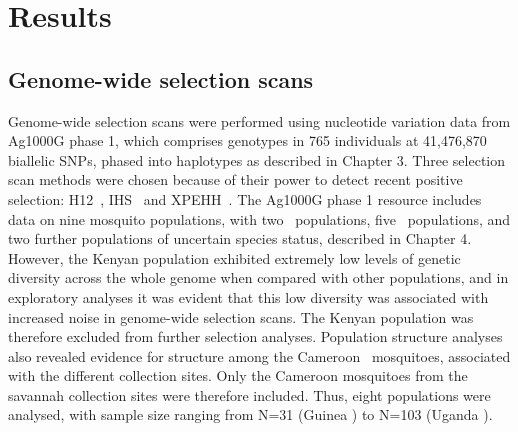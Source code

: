 \documentclass[a4paper,11pt,abstracton,hidelinks]{scrartcl}
\begin{document}
\section{Results}\label{sec:results}


\subsection{Genome-wide selection scans}\label{subsec:results-gwss}


Genome-wide selection scans were performed using nucleotide variation data from Ag1000G phase 1, which comprises genotypes in 765 individuals at 41,476,870 biallelic SNPs, phased into haplotypes as described in Chapter 3.
%
Three selection scan methods were chosen because of their power to detect recent positive selection: H12~\parencite{Garud2015}, IHS~\parencite{Voight2006} and XPEHH~\parencite{Sabeti2007}.
%
The Ag1000G phase 1 resource includes data on nine mosquito populations, with two \acol\ populations, five \agam\ populations, and two further populations of uncertain species status, described in Chapter 4.
%
However, the Kenyan population exhibited extremely low levels of genetic diversity across the whole genome when compared with other populations, and in exploratory analyses it was evident that this low diversity was associated with increased noise in genome-wide selection scans.
%
The Kenyan population was therefore excluded from further selection analyses.
%
Population structure analyses also revealed evidence for structure among the Cameroon \agam\ mosquitoes, associated with the different collection sites.
%
Only the Cameroon mosquitoes from the savannah collection sites were therefore included.
%
Thus, eight populations were analysed, with sample size ranging from N=31 (Guinea \agam) to N=103 (Uganda \agam).
\end{document}
